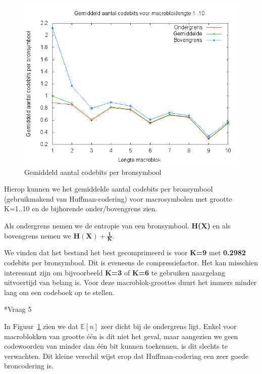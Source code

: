 \documentclass[]{article}
\begin{document}
\begin{section}
\begin{subsection}
        \begin{figure}[h]
            \centering
            \includegraphics[width=\textwidth]{vraag1_4.png}
            \caption{Gemiddeld aantal codebits per bronsymbool}
            \label{fig:codebits}
        \end{figure}

        Hierop kunnen we het gemiddelde aantal codebits per bronsymbool
        (gebruikmakend van Huffman-codering) voor macrosymbolen met
        grootte K=1..10 en de bijhorende onder/bovengrens zien.

        Als ondergrens nemen we de entropie van een bronsymbool.
        \textbf{H(X)} en als bovengrens nemen we
        $\mathbf{H(X) +\frac{1}{K}}$.

        We vinden dat het bestand het best gecomprimeerd is voor
        \textbf{K=9} met \textbf{0.2982} codebits per bronsymbool. Dit
        is eveneens de compressiefactor. Het kan misschien  interessant
        zijn om bijvoorbeeld \textbf{K=3} of \textbf{K=6} te gebruiken
        naargelang uitvoertijd van belang is. Voor deze
        macroblok-groottes duurt het immers minder lang om een codeboek
        op te stellen.
		
    \end{subsection}

    \begin{subsection}*{Vraag 5}

        In Figuur~\ref{fig:codebits} zien we dat $\mathbb{E}[n]$ zeer
        dicht bij de ondergrens ligt. Enkel voor macroblokken van
        grootte \'e\'en is dit niet het geval, maar aangezien we geen
        codewoorden van minder dan \'e\'en bit kunnen toekennen, is dit
        slechts te verwachten. Dit kleine verschil wijst erop dat
        Huffman-codering een zeer goede broncodering is.


\end{subsection}
\end{section}
\end{document}
